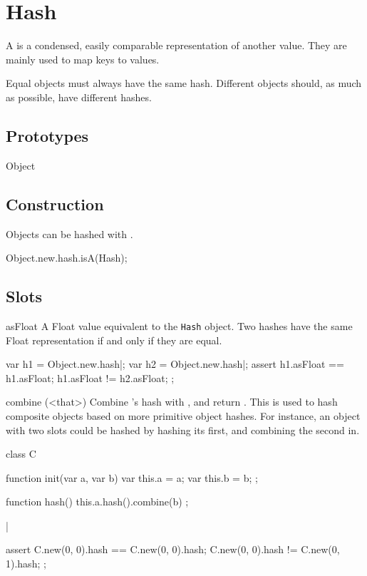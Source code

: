 
\section{Hash}

A  is a condensed, easily comparable representation of another
value. They are mainly used to map  keys to values.

Equal objects must always have the same hash. Different objects should, as
much as possible, have different hashes.

\subsection{Prototypes}
\begin{refObjects}
\item[Object]
\end{refObjects}

\subsection{Construction}
Objects can be hashed with .
\begin{urbiassert}
Object.new.hash.isA(Hash);
\end{urbiassert}

\subsection{Slots}
\begin{urbiscriptapi}
\item[asFloat] A Float value equivalent to the \lstinline|Hash| object. Two
  hashes have the same Float representation if and only if they are equal.
\begin{urbiscript}
var h1 = Object.new.hash|;
var h2 = Object.new.hash|;
assert
{
  h1.asFloat == h1.asFloat;
  h1.asFloat != h2.asFloat;
};
\end{urbiscript}


\item[combine](<that>)%
  Combine \that's hash with \this, and return \this. This is used to hash
  composite objects based on more primitive object hashes. For instance, an
  object with two slots could be hashed by hashing its first, and
  combining the second in.

\begin{urbiscript}
class C
{
  function init(var a, var b)
  {
    var this.a = a;
    var this.b = b;
  };

  function hash()
  {
    this.a.hash().combine(b)
  };
}|

assert
{
  C.new(0, 0).hash == C.new(0, 0).hash;
  C.new(0, 0).hash != C.new(0, 1).hash;
};
\end{urbiscript}
\end{urbiscriptapi}

